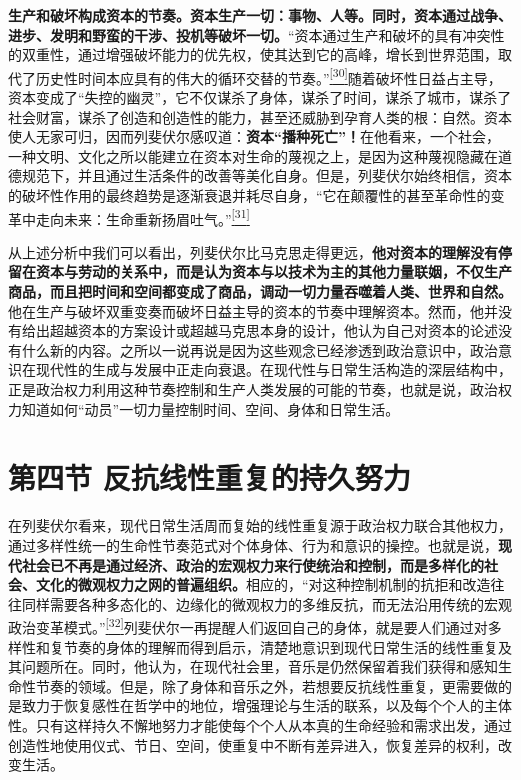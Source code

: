 \documentclass[UTF8, fontset = sourcesans, a4paper, oneside, zihao =
-4, scheme=chinese, no-math, space=true]{ctexbook}
\begin{document}
\textbf{生产和破坏构成资本的节奏。资本生产一切：事物、人等。同时，资本通过战争、进步、发明和野蛮的干涉、投机等破坏一切。}``资本通过生产和破坏的具有冲突性的双重性，通过增强破坏能力的优先权，使其达到它的高峰，增长到世界范围，取代了历史性时间本应具有的伟大的循环交替的节奏。''\protect\hypertarget{part0009_split_003.htmlux5cux23w30}{}{}\protect\hyperlink{part0009_split_004.htmlux5cux23m30}{\textsuperscript{{[}30{]}}}随着破坏性日益占主导，资本变成了``失控的幽灵''，它不仅谋杀了身体，谋杀了时间，谋杀了城市，谋杀了社会财富，谋杀了创造和创造性的能力，甚至还威胁到孕育人类的根：自然。资本使人无家可归，因而列斐伏尔感叹道：\textbf{资本``播种死亡''！}在他看来，一个社会，一种文明、文化之所以能建立在资本对生命的蔑视之上，是因为这种蔑视隐藏在道德规范下，并且通过生活条件的改善等美化自身。但是，列斐伏尔始终相信，资本的破坏性作用的最终趋势是逐渐衰退并耗尽自身，``它在颠覆性的甚至革命性的变革中走向未来：生命重新扬眉吐气。''\protect\hypertarget{part0009_split_003.htmlux5cux23w31}{}{}\protect\hyperlink{part0009_split_004.htmlux5cux23m31}{\textsuperscript{{[}31{]}}}

从上述分析中我们可以看出，列斐伏尔比马克思走得更远，\textbf{他对资本的理解没有停留在资本与劳动的关系中，而是认为资本与以技术为主的其他力量联姻，不仅生产商品，而且把时间和空间都变成了商品，调动一切力量吞噬着人类、世界和自然。}他在生产与破坏双重变奏而破坏日益主导的资本的节奏中理解资本。然而，他并没有给出超越资本的方案设计或超越马克思本身的设计，他认为自己对资本的论述没有什么新的内容。之所以一说再说是因为这些观念已经渗透到政治意识中，政治意识在现代性的生成与发展中正走向衰退。在现代性与日常生活构造的深层结构中，正是政治权力利用这种节奏控制和生产人类发展的可能的节奏，也就是说，政治权力知道如何``动员''一切力量控制时间、空间、身体和日常生活。

\protect\hypertarget{part0009_split_004.html}{}{}

\hypertarget{part0009_split_004.htmlux5cux23b017}{\section{第四节
反抗线性重复的持久努力}\label{part0009_split_004.htmlux5cux23b017}}

在列斐伏尔看来，现代日常生活周而复始的线性重复源于政治权力联合其他权力，通过多样性统一的生命性节奏范式对个体身体、行为和意识的操控。也就是说，\textbf{现代社会已不再是通过经济、政治的宏观权力来行使统治和控制，而是多样化的社会、文化的微观权力之网的普遍组织。}相应的，``对这种控制机制的抗拒和改造往往同样需要各种多态化的、边缘化的微观权力的多维反抗，而无法沿用传统的宏观政治变革模式。''\protect\hypertarget{part0009_split_004.htmlux5cux23w32}{}{}\protect\hyperlink{part0009_split_004.htmlux5cux23m32}{\textsuperscript{{[}32{]}}}列斐伏尔一再提醒人们返回自己的身体，就是要人们通过对多样性和复节奏的身体的理解而得到启示，清楚地意识到现代日常生活的线性重复及其问题所在。同时，他认为，在现代社会里，音乐是仍然保留着我们获得和感知生命性节奏的领域。但是，除了身体和音乐之外，若想要反抗线性重复，更需要做的是致力于恢复感性在哲学中的地位，增强理论与生活的联系，以及每个个人的主体性。只有这样持久不懈地努力才能使每个个人从本真的生命经验和需求出发，通过创造性地使用仪式、节日、空间，使重复中不断有差异进入，恢复差异的权利，改变生活。
\end{document}
